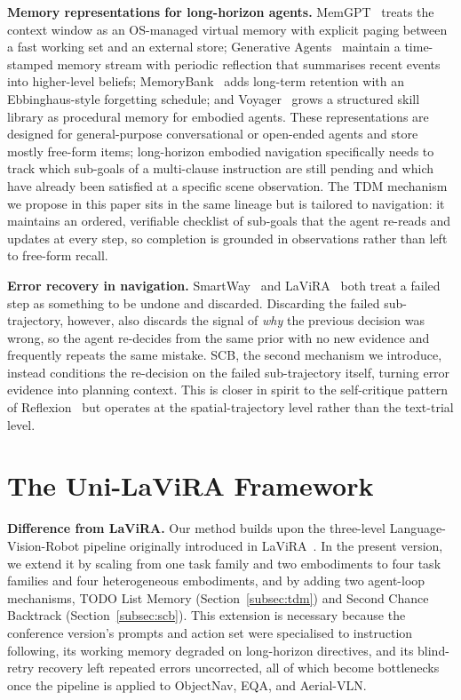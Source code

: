 \documentclass[conference]{IEEEtran}
\newcommand{\ourmethod}{Uni-LaViRA\xspace}
\begin{document}
\textbf{Memory representations for long-horizon agents.}
MemGPT~\cite{packer2023memgpt} treats the context window as an OS-managed
virtual memory with explicit paging between a fast working set and an external
store; Generative Agents~\cite{park2023generative} maintain a time-stamped
memory stream with periodic reflection that summarises recent events into
higher-level beliefs; MemoryBank~\cite{zhong2024memorybank} adds long-term
retention with an Ebbinghaus-style forgetting schedule; and
Voyager~\cite{wang2024voyager} grows a structured skill library as procedural
memory for embodied agents. These representations are designed for
general-purpose conversational or open-ended agents and store mostly free-form
items; long-horizon embodied navigation specifically needs to track which
sub-goals of a multi-clause instruction are still pending and which have
already been satisfied at a specific scene observation. The
TDM mechanism we propose in this paper sits in the same lineage but is
tailored to navigation: it maintains an ordered, verifiable checklist of
sub-goals that the agent re-reads and updates at every step, so completion is
grounded in observations rather than left to free-form recall.

\textbf{Error recovery in navigation.} SmartWay~\cite{shi2025smartway} and
LaViRA~\cite{ding2025lavira} both treat a failed step as
something to be undone and discarded. Discarding the failed sub-trajectory,
however, also discards the signal of \emph{why} the previous decision was
wrong, so the agent re-decides from the same prior with no new evidence and
frequently repeats the same mistake. SCB, the second mechanism
we introduce, instead conditions the re-decision on the failed
sub-trajectory itself, turning error evidence into planning context. This is
closer in spirit to the self-critique pattern of
Reflexion~\cite{shinn2023reflexion} but operates at the spatial-trajectory
level rather than the text-trial level.

\section{The \ourmethod Framework}
\label{sec:method}

\textbf{Difference from LaViRA.} Our method builds upon the three-level
Language-Vision-Robot pipeline originally introduced in
LaViRA~\cite{ding2025lavira}. In the present version, we extend it by scaling
from one task family and two embodiments to four task families and four
heterogeneous embodiments, and by adding two agent-loop mechanisms, TODO List
Memory (Section~\ref{subsec:tdm}) and Second Chance Backtrack
(Section~\ref{subsec:scb}). This extension is necessary because the conference
version's prompts and action set were specialised to instruction following,
its working memory degraded on long-horizon directives, and its blind-retry
recovery left repeated errors uncorrected, all of which become bottlenecks
once the pipeline is applied to ObjectNav, EQA, and Aerial-VLN.
\end{document}

